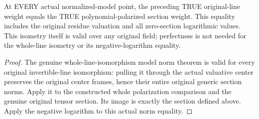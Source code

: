 \begin{lemma}
\label{local:actual-original-polarized-model-weight-isometry}
\leanok
{}
At EVERY actual normalized-model point, the preceding TRUE original-line weight
equals the TRUE polynomial-polarized section weight. This equality includes the
original residue valuation and all zero-section logarithmic values.
This isometry itself is valid over any original field; perfectness is not
needed for the whole-line isometry or its negative-logarithm equality.
\end{lemma}
\begin{proof}
The genuine whole-line-isomorphism model norm theorem is valid for every
original invertible-line isomorphism: pulling it through the actual valuative
center preserves the original center frames, hence their entire original
generic section norms. Apply it to the constructed whole polarization
comparison and the genuine original tensor section. Its image is exactly the
section defined above. Apply the negative logarithm to this actual norm equality.
\end{proof}

